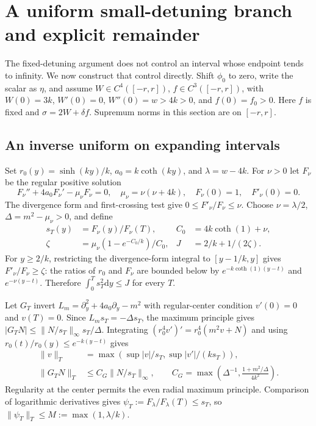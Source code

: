 \documentclass[11pt]{article}
\newcommand{\dd}{\mathrm{d}}
\begin{document}
\section{A uniform small-detuning branch and explicit remainder}\label{sec:uniform}
The fixed-detuning argument does not control an interval whose endpoint tends to infinity. We now construct that control directly. Shift $\phi_0$ to zero, write the scalar as $\eta$, and assume $W\in C^4([-r,r])$, $f\in C^3([-r,r])$, with $W(0)=3k$, $W'(0)=0$, $W''(0)=w>4k>0$, and $f(0)=f_0>0$. Here $f$ is fixed and $\sigma=2W+\delta f$. Supremum norms in this section are on $[-r,r]$.

\subsection{An inverse uniform on expanding intervals}
Set $r_0(y)=\sinh(ky)/k$, $a_0=k\coth(ky)$, and $\lambda=w-4k$. For $\nu>0$ let $F_\nu$ be the regular positive solution
\begin{equation}
F_\nu''+4a_0F_\nu'-\mu_\nu F_\nu=0,\quad
\mu_\nu=\nu(\nu+4k),\quad F_\nu(0)=1,\quad F'_\nu(0)=0.
\end{equation}
The divergence form and first-crossing test give $0\le F'_\nu/F_\nu\le\nu$. Choose $\nu=\lambda/2$, $\Delta=m^2-\mu_\nu>0$, and define
\begin{align}
s_T(y)&=F_\nu(y)/F_\nu(T),&C_0&=4k\coth(1)+\nu,\nonumber\\
\zeta&=\mu_\nu(1-e^{-C_0/k})/C_0,&J&=2/k+1/(2\zeta).
\end{align}
For $y\ge2/k$, restricting the divergence-form integral to $[y-1/k,y]$ gives $F'_\nu/F_\nu\ge\zeta$: the ratios of $r_0$ and $F_\nu$ are bounded below by $e^{-k\coth(1)(y-t)}$ and $e^{-\nu(y-t)}$. Therefore $\int_0^T s_T^2\dd y\le J$ for every $T$.

Let $G_T$ invert $L_m=\partial_y^2+4a_0\partial_y-m^2$ with regular-center condition $v'(0)=0$ and $v(T)=0$. Since $L_ms_T=-\Delta s_T$, the maximum principle gives $|G_TN|\le\|N/s_T\|_\infty s_T/\Delta$. Integrating $(r_0^4v')'=r_0^4(m^2v+N)$ and using $r_0(t)/r_0(y)\le e^{-k(y-t)}$ gives
\begin{align}
\|v\|_T&=\max\left(\sup|v|/s_T,\sup|v'|/(ks_T)\right),\nonumber\\
\|G_TN\|_T&\le C_G\|N/s_T\|_\infty,
\qquad C_G=\max\left(\Delta^{-1},\frac{1+m^2/\Delta}{4k^2}\right).
\end{align}
Regularity at the center permits the even radial maximum principle. Comparison of logarithmic derivatives gives $\psi_T:=F_\lambda/F_\lambda(T)\le s_T$, so $\|\psi_T\|_T\le M:=\max(1,\lambda/k)$.
\end{document}

